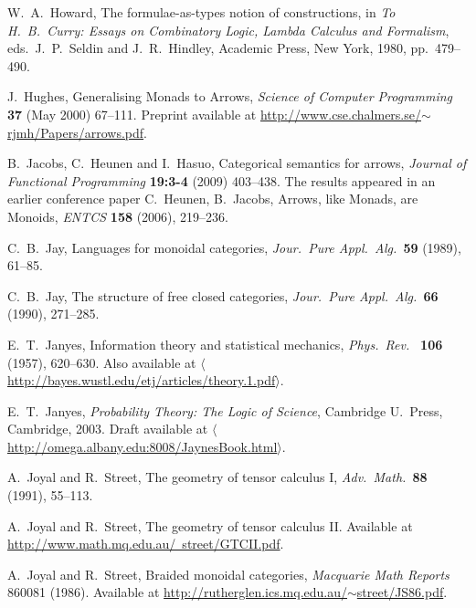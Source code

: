 \documentclass[12pt,twoside,openright]{report}
\begin{document}
\begin{thebibliography}{99}
 W.\ A.\ Howard, The formulae-as-types notion of constructions, in {\sl To H.\ B.\ Curry: Essays on Combinatory Logic, Lambda Calculus and Formalism}, eds.\ J.\ P.\ Seldin and J.\ R.\
Hindley, Academic Press, New York, 1980, pp.\ 479--490.

 J.\ Hughes, Generalising Monads to Arrows, \emph{Science of Computer Programming} \textbf{37} (May 2000) 67--111.  Preprint available at \href{http://www.cse.chalmers.se/~rjmh/Papers/arrows.pdf}{http://www.cse.chalmers.se/$\sim$rjmh/Papers/arrows.pdf}.

 B.\ Jacobs, C.\ Heunen and I.\ Hasuo, Categorical semantics for arrows, {\sl Journal of Functional Programming} 
\textbf{19:3-4} (2009) 403--438.  The results appeared in an earlier conference paper C.\ Heunen, B.\ Jacobs, Arrows, like Monads, are Monoids, {\sl ENTCS} \textbf{158} (2006), 219--236.

C.\ B.\ Jay, Languages for monoidal categories, 
{\sl Jour.\ Pure Appl.\ Alg.\ }{\bf 59} (1989), 61--85.

C.\ B.\ Jay, The structure of free closed categories, 
{\sl Jour.\ Pure Appl.\ Alg.\ }{\bf 66} (1990), 271--285. 

 E.\ T.\ Janyes, Information theory and statistical mechanics, \textit{Phys.\ Rev.\ } 
\textbf{106} (1957), 620--630.  Also available at  \hfill \break
\href{http://bayes.wustl.edu/etj/articles/theory.1.pdf}
{$\langle$http://bayes.wustl.edu/etj/articles/theory.1.pdf$\rangle$}.

 E.\ T.\ Janyes, 
{\sl Probability Theory: The Logic of Science}, Cambridge U.\ Press, Cambridge, 2003. Draft available at \hfill \break
 \href{http://omega.albany.edu:8008/JaynesBook.html}
{$\langle$http://omega.albany.edu:8008/JaynesBook.html$\rangle$}.

A.\ Joyal and R.\ Street, The geometry of tensor calculus I, 
{\sl Adv.\ Math.\ }{\bf 88} (1991), 55--113.

A.\ Joyal and R.\ Street, The geometry of tensor calculus II. Available at
\hfill \break
\href{http://www.math.mq.edu.au/~street/GTCII.pdf}
{http://www.math.mq.edu.au/~street/GTCII.pdf}.

 A.\ Joyal and R.\ Street, Braided monoidal categories,
{\sl Macquarie Math Reports} 860081 (1986).  Available at
\href{http://rutherglen.ics.mq.edu.au/~street/JS86.pdf}{
http://rutherglen.ics.mq.edu.au/$\sim$street/JS86.pdf}.


\end{thebibliography}
\end{document}
